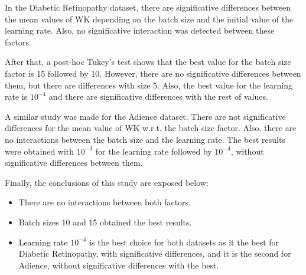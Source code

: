 \documentclass[10pt, a4paper, titlepage, twocolumn]{article}
\begin{document}
	In the Diabetic Retinopathy dataset, there are significative differences between the mean values of WK depending on the batch size and the initial value of the learning rate. Also, no significative interaction was detected between these factors.
	
	After that, a post-hoc Tukey's test shows that the best value for the batch size factor is 15 followed by 10. However, there are no significative differences between them, but there are differences with size 5. Also, the best value for the learning rate is $10^{-4}$ and there are significative differences with the rest of values.
	
	A similar study was made for the Adience dataset. There are not significative differences for the mean value of WK w.r.t. the batch size factor. Also, there are no interactions between the batch size and the learning rate. The best results were obtained with $10^{-3}$ for the learning rate followed by $10^{-4}$, without significative differences between them.
	
	Finally, the conclusions of this study are exposed below:
	\begin{itemize}
		\item There are no interactions between both factors.
		\item Batch sizes 10 and 15 obtained the best results.
		\item Learning rate $10^{-4}$ is the best choice for both datasets as it the best for Diabetic Retinopathy, with significative differences, and it is the second for Adience, without significative differences with the best. 
	\end{itemize}
	
\end{document}
